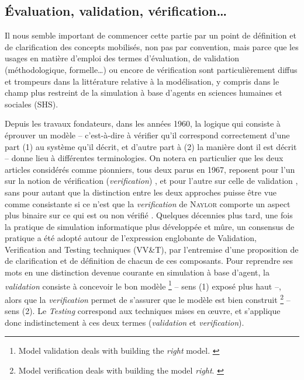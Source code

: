\subsection{Évaluation, validation, vérification\ldots \label{subsec:vocab-eval}}

Il nous semble important de commencer cette partie par un point de définition et de clarification des concepts mobilisés, non pas par convention, mais parce que les usages en matière d'emploi des termes d'évaluation, de validation (méthodologique, formelle\ldots) ou encore de vérification sont particulièrement diffus et trompeurs dans la littérature relative à la modélisation, y compris dans le champ plus restreint de la simulation à base d'agents en sciences humaines et sociales (SHS).

Depuis les travaux fondateurs, dans les années 1960, la logique qui consiste à éprouver un modèle -- c'est-à-dire à vérifier qu'il correspond correctement d'une part (1) au système qu'il décrit, et d'autre part à
(2) la manière dont il est décrit -- donne lieu à différentes terminologies.
On notera en particulier que les deux articles considérés comme pionniers, tous deux parus en 1967, reposent pour l'un sur la notion de vérification (\textit{verification}) \autocite{naylor_verification_1967}, et pour l'autre sur celle de validation \autocite{hermann_validation_1967}, sans pour autant que la distinction entre les deux approches puisse être vue comme consistante si ce n'est que la \textit{verification} de \textsc{Naylor} comporte un aspect plus \og binaire\fg{} sur ce qui est ou non vérifié \autocite[137]{rey-coyrehourcq_plateforme_2015}.
Quelques décennies plus tard, une fois la pratique de simulation informatique plus développée et mûre, un consensus de pratique a été adopté autour de l'expression englobante de \og Validation, Verification and Testing techniques (VV\&T)\fg{}, par l'entremise d'une proposition de \textcite{balci_validation_1994} de clarification et de définition de chacun de ces composants.
Pour reprendre ses mots en une distinction devenue courante en simulation à base d'agent, la \textit{validation} consiste à concevoir le bon modèle 
\footnote{
	\og Model validation deals with building the \textit{right} model.\fg{} \autocite[121]{balci_validation_1994}
} -- sens (1) exposé plus haut --,
alors que la \textit{verification} permet de s'assurer que le modèle est bien construit
\footnote{
	\og Model verification deals with building the model \textit{right}.\fg{} \autocite[123]{balci_validation_1994}
} -- sens (2).
Le \og \textit{Testing}\fg{} correspond aux techniques mises en œuvre, et s'applique donc indistinctement à ces deux termes (\textit{validation} et \textit{verification}).

